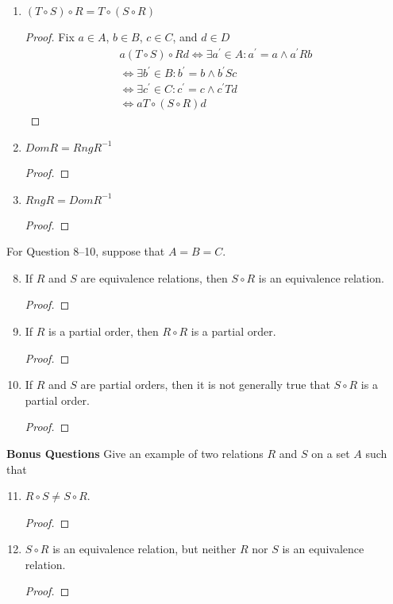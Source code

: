 \documentclass{article}
\begin{document}
\begin{enumerate}
    \item $(T \circ S) \circ R = T \circ (S \circ R)$
      \begin{proof}
        Fix $a\in A$, $b\in B$, $c\in C$, and $d\in D$
        \begin{align*}
          a(T\circ S)\circ Rd \iff \exists a^{'}\in A: a^{'}=a \wedge a^{'}Rb \\
          \iff \exists b^{'}\in B: b^{'}=b \wedge b^{'}Sc \\
          \iff \exists c^{'}\in C: c^{'}=c \wedge c^{'}Td \\
          \iff aT\circ(S\circ R)d
        \end{align*}
      \end{proof}
    \item $Dom R = Rng R^{-1}$
      \begin{proof}
        
      \end{proof}
    \item $Rng R = Dom R^{-1}$
      \begin{proof}
        
      \end{proof}
  \end{enumerate}
  For Question 8–10, suppose that $A = B = C$.
  \begin{enumerate} \setcounter{enumi}{7}
    \item If $R$ and $S$ are equivalence relations, then $S \circ R$ is an equivalence relation.
      \begin{proof}
        
      \end{proof}
    \item If $R$ is a partial order, then $R \circ R$ is a partial order.
      \begin{proof}
        
      \end{proof}
    \item If $R$ and $S$ are partial orders, then it is not generally true that $S \circ R$ is a partial order.
      \begin{proof}
        
      \end{proof}
  \end{enumerate}
  \textbf{Bonus Questions}
  Give an example of two relations $R$ and $S$ on a set $A$ such that \\
  \begin{enumerate} \setcounter{enumi}{10}
    \item $R \circ S \neq S \circ R$.
      \begin{proof}
        
      \end{proof}
    \item $S \circ R$ is an equivalence relation, but neither $R$ nor $S$ is an equivalence relation.
      \begin{proof}
        
      \end{proof}
   \end{enumerate}
\end{document}
